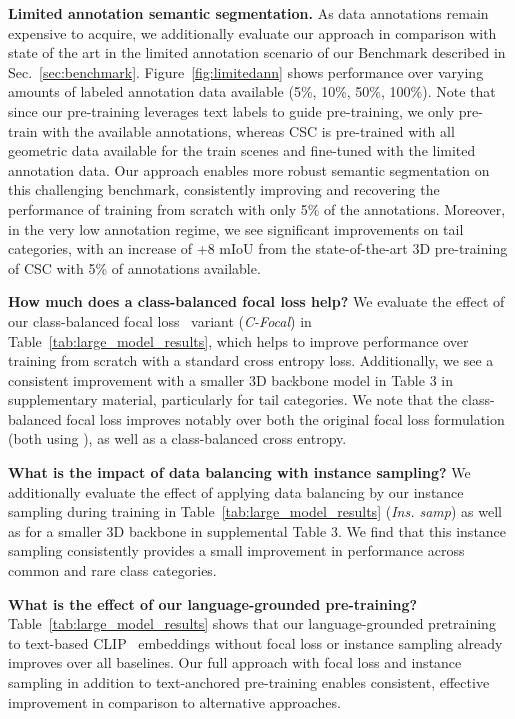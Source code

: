 \smallskip
\noindent \textbf{Limited annotation semantic segmentation.}
As data annotations remain expensive to acquire, we additionally evaluate our approach in comparison with state of the art in the limited annotation scenario of our \OURS{} Benchmark described in Sec.~\ref{sec:benchmark}.
Figure~\ref{fig:limitedann} shows performance over varying amounts of labeled annotation data available (5\%, 10\%, 50\%, 100\%).
Note that since our pre-training leverages text labels to guide pre-training, we only pre-train with the available annotations, whereas CSC is pre-trained with all geometric data available for the train scenes and fine-tuned with the limited annotation data.
Our approach enables more robust semantic segmentation on this challenging benchmark, consistently improving and recovering the performance of training from scratch with only 5\% of the annotations. Moreover, in the very low annotation regime, we see significant improvements on tail categories, with an increase of +8 mIoU from the state-of-the-art 3D pre-training of CSC with 5\% of annotations available.


\smallskip
\noindent \textbf{How much does a class-balanced focal loss help?}
We evaluate the effect of our class-balanced  focal loss~\cite{focalloss} variant (\emph{C-Focal}) in Table~\ref{tab:large_model_results}, which helps to improve performance over training from scratch with a standard cross entropy loss.
Additionally, we see a consistent improvement with a smaller 3D backbone model in Table 3 in supplementary material, particularly for tail categories. We note that the class-balanced focal loss improves notably over both the original focal loss formulation (both using ), as well as a class-balanced cross entropy.

\smallskip
\noindent \textbf{What is the impact of data balancing with instance sampling?}
We additionally evaluate the effect of applying data balancing by our instance sampling during training in Table~\ref{tab:large_model_results} (\emph{Ins. samp}) as well as for a smaller 3D backbone in supplemental Table 3. 
We find that this instance sampling consistently provides a small improvement in performance across common and rare class categories.

\smallskip
\noindent \textbf{What is the effect of our language-grounded pre-training?}
Table~\ref{tab:large_model_results} shows that our language-grounded pretraining to text-based CLIP~\cite{clip} embeddings without focal loss or instance sampling already improves over all baselines.
Our full approach with focal loss and instance sampling in addition to text-anchored pre-training enables consistent, effective improvement in comparison to alternative approaches.


